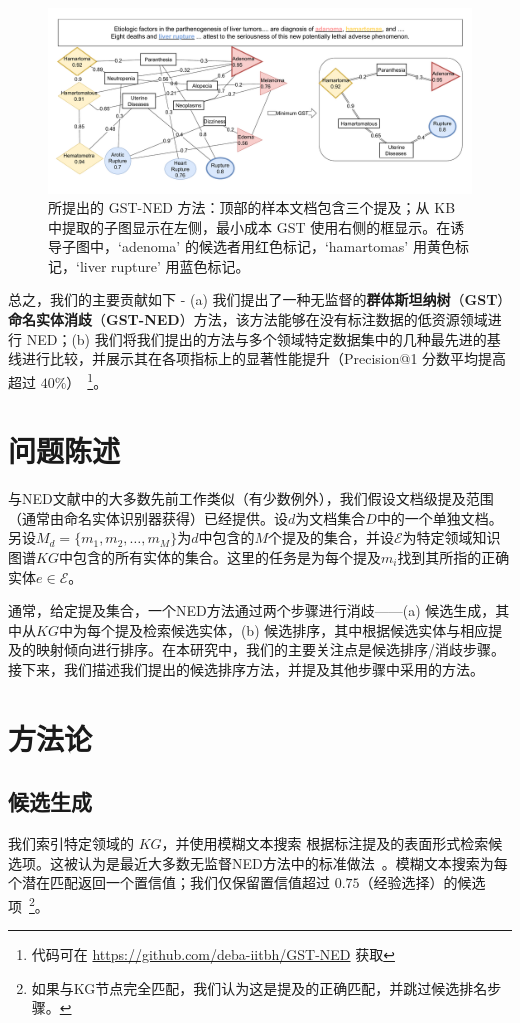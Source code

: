 \documentclass[11pt]{article}
\begin{document}
\begin{figure}
\includegraphics[width=\linewidth]{./pix/pipeline_m4.pdf}
\caption{所提出的 GST-NED 方法：顶部的样本文档包含三个提及；从 KB 中提取的子图显示在左侧，最小成本 GST 使用右侧的框显示。在诱导子图中，`adenoma' 的候选者用红色标记，`hamartomas' 用黄色标记，`liver rupture' 用蓝色标记。}
\label{fig:el-task}
\end{figure}

总之，我们的主要贡献如下 - (a) 我们提出了一种无监督的\textbf{群体斯坦纳树}（\textbf{GST}）\textbf{命名实体消歧}（\textbf{GST-NED}）方法，该方法能够在没有标注数据的低资源领域进行 NED；(b) 我们将我们提出的方法与多个领域特定数据集中的几种最先进的基线进行比较，并展示其在各项指标上的显著性能提升（Precision@1 分数平均提高超过 $40\%$）~\footnote{代码可在 \url{https://github.com/deba-iitbh/GST-NED} 获取}。
\section{问题陈述}
与NED文献中的大多数先前工作类似（有少数例外\cite{kolitsas2018end, sil2013re}），我们假设文档级提及范围（通常由命名实体识别器获得）已经提供。设$d$为文档集合$D$中的一个单独文档。另设$M_d = \{m_1, m_2, \ldots , m_M\}$为$d$中包含的$M$个提及的集合，并设$\mathcal{E}$为特定领域知识图谱$KG$中包含的所有实体的集合。这里的任务是为每个提及$m_i$找到其所指的正确实体$e \in \mathcal{E}$。

通常，给定提及集合，一个NED方法通过两个步骤进行消歧——(a) 候选生成，其中从$KG$中为每个提及检索候选实体，(b) 候选排序，其中根据候选实体与相应提及的映射倾向进行排序。在本研究中，我们的主要关注点是候选排序/消歧步骤。接下来，我们描述我们提出的候选排序方法，并提及其他步骤中采用的方法。
\section{方法论}
\subsection{候选生成}
我们索引特定领域的 $KG$，并使用模糊文本搜索 \cite{max_bachmann_2021_5584996} 根据标注提及的表面形式检索候选项。这被认为是最近大多数无监督NED方法中的标准做法~\cite{yang2023b, simos2022computationally}。模糊文本搜索为每个潜在匹配返回一个置信值；我们仅保留置信值超过 $0.75$（经验选择）的候选项~\footnote{如果与KG节点完全匹配，我们认为这是提及的正确匹配，并跳过候选排名步骤。}。
\end{document}
